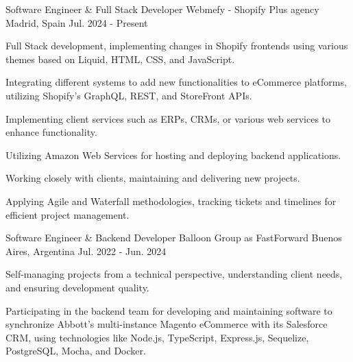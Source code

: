 

\begin{cventries}

\vspace{2mm}
\cventry
    {Software Engineer \& Full Stack Developer} %
    {Webmefy - Shopify Plus agency} %
    {Madrid, Spain} %
    {Jul. 2024 - Present} %
    {
      \begin{cvitems} %
        \item {Full Stack development, implementing changes in Shopify frontends using various themes based on Liquid, HTML, CSS, and JavaScript.}
        \item {Integrating different systems to add new functionalities to eCommerce platforms, utilizing Shopify's GraphQL, REST, and StoreFront APIs.}
        \item {Implementing client services such as ERPs, CRMs, or various web services to enhance functionality.}
        \item {Utilizing Amazon Web Services for hosting and deploying backend applications.}
        \item {Working closely with clients, maintaining and delivering new projects.}
        \item {Applying Agile and Waterfall methodologies, tracking tickets and timelines for efficient project management.}
      \end{cvitems}
    }
  \vspace{5.5mm}
\cventry
    {Software Engineer \& Backend Developer} %
    {Balloon Group as FastForward} %
    {Buenos Aires, Argentina} %
    {Jul. 2022 - Jun. 2024} %
    {
      \begin{cvitems} %
        \item {Self-managing projects from a technical perspective, understanding client needs, and ensuring development quality.}
        \item {Participating in the backend team for developing and maintaining software to synchronize Abbott's multi-instance Magento eCommerce with its Salesforce CRM, using technologies like Node.js, TypeScript, Express.js, Sequelize, PostgreSQL, Mocha, and Docker.}

\end{cvitems}}
\end{cventries}
